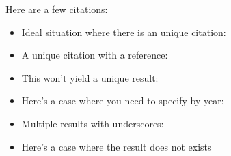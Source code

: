 \documentclass{article}
\begin{document}
Here are a few citations:
\begin{itemize}
    \item
        Ideal situation where there is an unique citation: \cite{mazur:eisenstein}
    \item
        A unique citation with a reference: \cite[Prop. 14.2]{mazur:eisenstein}
    \item
        This won't yield a unique result: \cite{mazur:modular}
    \item
        Here's a case where you need to specify by year:
        \cite{mazur:modular:2000}
    \item
        Multiple results with underscores:
        \cite{ribet:galois_real_multiplication}
    \item
        Here's a case where the result does not exists
        \cite{fermat:marvelous_proof}
\end{itemize}



\end{document}
